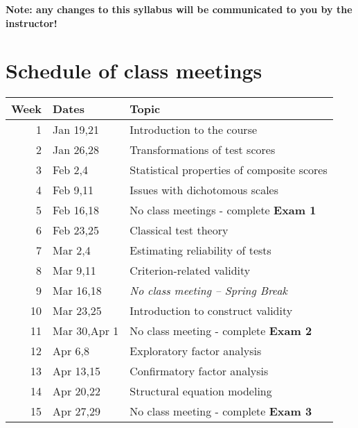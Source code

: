 \documentclass[10pt]{article}
\begin{document}
\textbf{Note:  any changes to this syllabus will be communicated to you by the instructor!}

\section*{Schedule of class meetings}
\label{sec:org6bc6888}

\begin{center}
\begin{tabular}{rll}
Week & Dates & Topic\\
\hline
1 & Jan 19,21 & Introduction to the course\\
2 & Jan 26,28 & Transformations of test scores\\
3 & Feb 2,4 & Statistical properties of composite scores\\
4 & Feb 9,11 & Issues with dichotomous scales\\
5 & Feb 16,18 & No class meetings - complete \textbf{Exam 1}\\
6 & Feb 23,25 & Classical test theory\\
7 & Mar 2,4 & Estimating reliability of tests\\
8 & Mar 9,11 & Criterion-related validity\\
9 & Mar 16,18 & \emph{No class meeting -- Spring Break}\\
10 & Mar 23,25 & Introduction to construct validity\\
11 & Mar 30,Apr 1 & No class meeting - complete \textbf{Exam 2}\\
12 & Apr 6,8 & Exploratory factor analysis\\
13 & Apr 13,15 & Confirmatory factor analysis\\
14 & Apr 20,22 & Structural equation modeling\\
15 & Apr 27,29 & No class meeting - complete \textbf{Exam 3}\\
\end{tabular}
\end{center}
\end{document}
